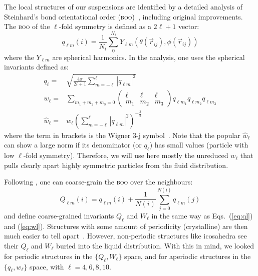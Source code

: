 The local structures of our suspensions are identified by a detailed analysis of Steinhard's bond orientational order (\textsc{boo})~\citep{steinhardt1983boo}, including original improvements. The \textsc{boo} of the $\ell$-fold symmetry is defined as a $2\ell+1$ vector:
\begin{equation}
	q_{\ell m}(i) = \frac{1}{N_i}\sum_{0}^{N_i} Y_{\ell m}(\theta(\vec r_{ij}),\phi(\vec r_{ij}))
	\label{eq:qlm}
\end{equation}
where the $Y_{\ell m}$ are spherical harmonics. In the analysis, one uses the spherical invariants defined as:
\begin{align}
	q_\ell =& \sqrt{\frac{4\pi}{2l+1} \sum_{m=-\ell}^{\ell} |q_{\ell m}|^2 }\label{eq:ql}\\
	w_\ell =& \sum_{m_1+m_2+m_3=0} 
			\left( \begin{array}{ccc}
				\ell & \ell & \ell \\
				m_1 & m_2 & m_3 
			\end{array} \right)
			q_{\ell m_1} q_{\ell m_2} q_{\ell m_3} \label{eq:wl}\\
	\hat{w}_\ell =& w_\ell{\left( \sum_{m=-\ell}^{\ell} |q_{\ell m}|^2 \right)}^{-\frac{3}{2}}
\end{align}
where the term in brackets is the Wigner 3-j symbol~\citep{Landau1965}. Note that the popular $\hat{w}_\ell$ can show a large norm if its denominator (or $q_\ell$) has small values (particle with low $\ell$-fold symmetry). Therefore, we will use here mostly the unreduced $w_\ell$ that pulls clearly apart highly symmetric particles from the fluid distribution.

Following \citet{Lechner2008}, one can coarse-grain the \textsc{boo} over the neighbours:
\begin{equation}
	Q_{\ell m}(i) = q_{\ell m}(i) + \frac{1}{N(i)} \sum_{j=0}^{N(i)} q_{\ell m}(j)
	\label{eq:Qlm}
\end{equation}
and define coarse-grained invariants $Q_\ell$ and $W_\ell$ in the same way as Eqs.~(\ref{eq:ql}) and (\ref{eq:wl}). Structures with some amount of periodicity (crystalline) are then much easier to tell apart~\citep{Lechner2008}. However, non-periodic structures like icosahedra see their $Q_\ell$ and $W_\ell$ buried into the liquid distribution. With this in mind, we looked for periodic structures in the $\lbrace Q_\ell, W_\ell\rbrace$ space, and for aperiodic structures in the $\lbrace q_\ell, w_\ell\rbrace$ space, with $\ell=4,6,8,10$.

